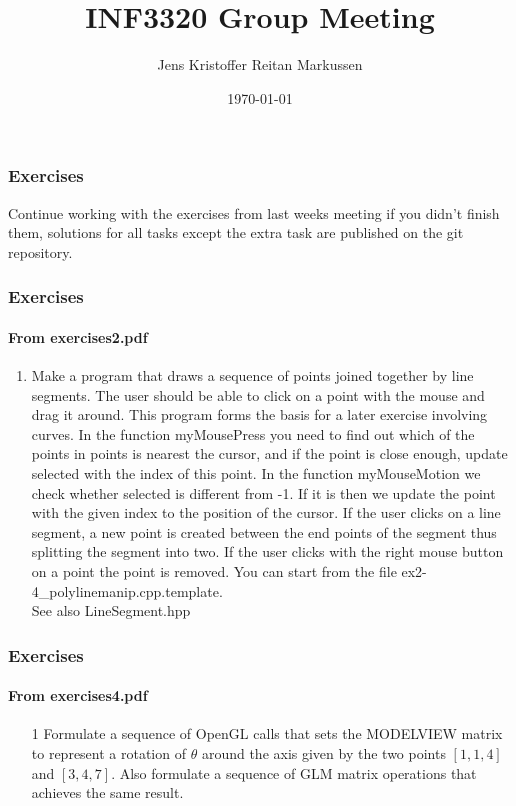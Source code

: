 \documentclass[11pt]{beamer}
\title{INF3320 Group Meeting}
\author{Jens Kristoffer Reitan Markussen}
\date{\today}
\begin{document}
	\begin{frame}
	\frametitle{Exercises}
	Continue working with the exercises from last weeks meeting if
	you didn't finish them, solutions for all tasks except the extra task
	are published on the git repository.
	\end{frame}

	\begin{frame}
	\frametitle{Exercises}
	\framesubtitle{From exercises2.pdf}
	\begin{enumerate}
	\item Make a program that draws a sequence of points joined together by line segments. The
user should be able to click on a point with the mouse and drag it around.
This program forms the basis for a later exercise involving curves.
In the function myMousePress you need to find out which of the points in points is
nearest the cursor, and if the point is close enough, update selected with the index of
this point.
In the function myMouseMotion we check whether selected is different from -1. If
it is then we update the point with the given index to the position of the cursor.
If the user clicks on a line segment, a new point is created between the end points of the
segment thus splitting the segment into two. If the user clicks with the right mouse button
on a point the point is removed.
You can start from the file ex2-4\_polylinemanip.cpp.template. \\
See also LineSegment.hpp

	\end{enumerate}
	\end{frame}
	
	\begin{frame}
	\frametitle{Exercises}
	\framesubtitle{From exercises4.pdf}
	\begin{enumerate}
	\item[1] Formulate a sequence of OpenGL calls that sets the MODELVIEW matrix to represent a rotation of $\theta$ around the axis given by the two points $[1,1,4]$ and $[3,4,7]$. Also formulate a sequence of GLM matrix operations that achieves the same result.
	

	\end{enumerate}
	\end{frame}
	
\end{document}
